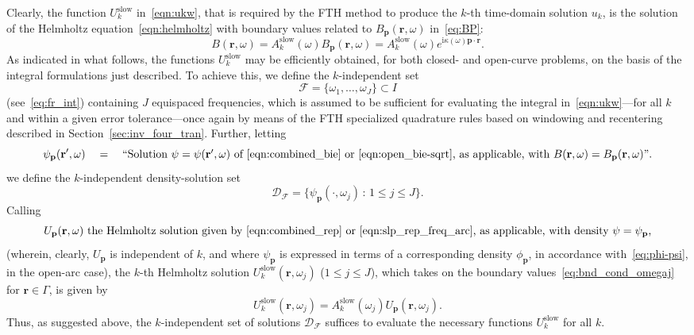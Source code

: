\documentclass[11pt]{article}
\theoremstyle{plain}
\theoremstyle{remark}
\def \br{\mathbf{r}}
\def \bp{\mathbf{p}}
\begin{document}
Clearly, the function $U_k^{\mathrm{slow}}$ in~\eqref{eqn:ukw}, that
is required by the FTH method to produce the $k$-th time-domain
solution $u_k$, is the solution of the Helmholtz
equation~\eqref{eqn:helmholtz} with boundary values related to
$B_\bp(\br,\omega)$ in~\eqref{eq:BP}: 
\begin{equation}
  \label{eq:bnd_cond_omegaj}
  B(\br,\omega) = A_k^{\mathrm{slow}}(\omega)B_\bp(\br,\omega) = A_k^{\mathrm{slow}}(\omega)e^{\mathrm{i}\kappa(\omega)\bp
  \cdot \br}.
\end{equation}
As indicated in what follows, the functions $U_k^{\mathrm{slow}}$ may
be efficiently obtained, for both closed- and open-curve problems, on
the basis of the integral formulations just described.  To achieve
this, we define the $k$-independent set 
\begin{equation}\label{eqn:F_freqs}
    \mathcal{F} = \{\omega_1, \dots, \omega_J\} \subset I
\end{equation}
(see~\eqref{eq:fr_int}) containing $J$ equispaced
frequencies, which is assumed to be sufficient for evaluating the
integral in~\eqref{eqn:ukw}---for all $k$ and within a given error
tolerance---once again by means of the FTH specialized quadrature
rules based on windowing and recentering described in
Section~\ref{sec:inv_four_tran}.  Further, letting
\begin{equation}
  \label{eq:psi_p_sol}
  \psi_\bp(\br',\omega)\quad = \quad\mbox{``Solution $\psi =\psi(\br',\omega)$ of~\eqref{eqn:combined_bie} or~\eqref{eqn:open_bie-sqrt}, as applicable, with $B(\br,\omega) = B_\bp(\br,\omega)$''}.
\end{equation}
we define the $k$-independent density-solution set
\begin{equation}\label{eqn:dens_set}
  \mathcal{D}_\mathcal{F} =\{\psi_\bp(\cdot,\omega_j)\, :\, 1 \le j \le
  J\}.
\end{equation}
Calling
\begin{equation}
  \label{eq:Up}
  U_\bp(\br,\omega)\mbox{ the 
    Helmholtz solution given  by~\eqref{eqn:combined_rep} or~\eqref{eqn:slp_rep_freq_arc}, as applicable, with  density
    $\psi = \psi_\bp$,}
\end{equation}
(wherein, clearly, $U_\bp$ is independent of $k$, and where $\psi_\bp$
is expressed in terms of a corresponding density $\phi_\bp$, in
accordance with~\eqref{eq:phi-psi}, in the open-arc case), the $k$-th
Helmholtz solution $U_{k}^{\mathrm{slow}}(\br,\omega_j)$
($1\leq j\leq J$), which takes on the boundary
values~\eqref{eq:bnd_cond_omegaj} for $\br\in\Gamma$, is given by
\begin{equation}
  \label{eq:ukslow}
  U_k^{\mathrm{slow}}(\br,\omega_j) =
  A_{k}^{\mathrm{slow}}(\omega_j)U_\bp(\br,\omega_j).
\end{equation}
Thus, as suggested above, the
$k$-independent set of solutions
$\mathcal{D}_\mathcal{F}$ suffices to evaluate the necessary functions
$U_k^{\mathrm{slow}}$ for all $k$.
\end{document}
